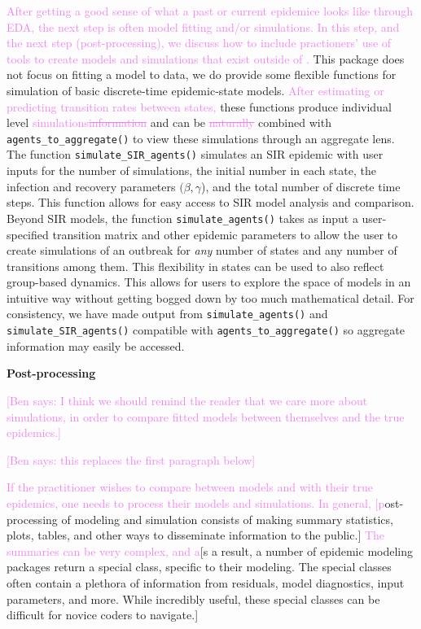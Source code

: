 \documentclass[
  shortnames]{jss}
\begin{document}
\textcolor{violet}{After getting a good sense of what a past or current epidemice looks like through EDA, the next step is often model fitting and/or simulations. In this step, and the next step (post-processing), we discuss how to include practioners' use of tools to create models and simulations that exist outside of .}
This package does not focus on fitting a model to data, we do provide
some flexible functions for simulation of basic discrete-time
epidemic-state models.
\textcolor{violet}{After estimating or predicting transition rates between states,}
these functions produce individual level
\textcolor{violet}{simulations\sout{information}} and can be
\textcolor{violet}{\sout{naturally}} combined with
\texttt{agents\_to\_aggregate()} to view these simulations through an
aggregate lens. The function \texttt{simulate\_SIR\_agents()} simulates
an SIR epidemic with user inputs for the number of simulations, the
initial number in each state, the infection and recovery parameters
\((\beta, \gamma\)), and the total number of discrete time steps. This
function allows for easy access to SIR model analysis and comparison.
Beyond SIR models, the function \texttt{simulate\_agents()} takes as
input a user-specified transition matrix and other epidemic parameters
to allow the user to create simulations of an outbreak for \textit{any}
number of states and any number of transitions among them. This
flexibility in states can be used to also reflect group-based dynamics.
This allows for users to explore the space of models in an intuitive way
without getting bogged down by too much mathematical detail. For
consistency, we have made output from \texttt{simulate\_agents()} and
\texttt{simulate\_SIR\_agents()} compatible with
\texttt{agents\_to\_aggregate()} so aggregate information may easily be
accessed.

\textbf{Post-processing}

\textcolor{violet}{[Ben says: I think we should remind the reader that we care more about simulations, in order to compare fitted models between themselves and the true epidemics.]}

\textcolor{violet}{[Ben says: this replaces the first paragraph below]}

\textcolor{violet}{If the practitioner wishes to compare between models and with their true epidemics, one needs to process their models and simulations.}
\textcolor{violet}{In general, [p}ost-processing of modeling and
simulation consists of making summary statistics, plots, tables, and
other ways to disseminate information to the public.{]}
\textcolor{violet}{The summaries can be very complex, and a}{[}s a
result, a number of epidemic modeling \textcolor{violet}{}
packages return a special class, specific to their modeling. The special
classes often contain a plethora of information from residuals, model
diagnostics, input parameters, and more. While incredibly useful, these
special classes can be difficult for novice coders to navigate.{]}
\end{document}
